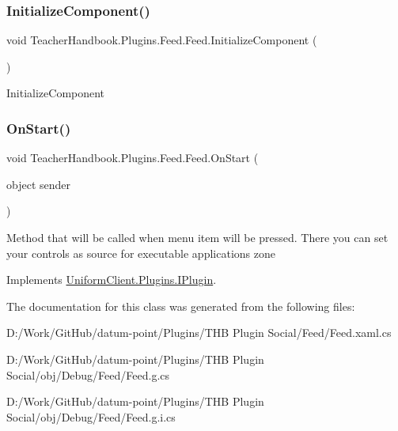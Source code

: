 \subsubsection{\texorpdfstring{Initialize\+Component()}{InitializeComponent()}\hspace{0.1cm}{\footnotesize\ttfamily [7/7]}}
{\footnotesize\ttfamily void Teacher\+Handbook.\+Plugins.\+Feed.\+Feed.\+Initialize\+Component (\begin{DoxyParamCaption}{ }\end{DoxyParamCaption})}



Initialize\+Component 

\mbox{\label{class_teacher_handbook_1_1_plugins_1_1_feed_1_1_feed_a70afd18136a6dc16b5edec667a02e6c6}} 
\subsubsection{\texorpdfstring{On\+Start()}{OnStart()}}
{\footnotesize\ttfamily void Teacher\+Handbook.\+Plugins.\+Feed.\+Feed.\+On\+Start (\begin{DoxyParamCaption}\item[{object}]{sender }\end{DoxyParamCaption})}



Method that will be called when menu item will be pressed. There you can set your controls as source for executable application\textquotesingle{}s zone 



Implements \mbox{\hyperlink{interface_uniform_client_1_1_plugins_1_1_i_plugin_a1ca2220c7ce4a23f8f41af10efccf328}{Uniform\+Client.\+Plugins.\+I\+Plugin}}.



The documentation for this class was generated from the following files\+:\begin{DoxyCompactItemize}
\item 
D\+:/\+Work/\+Git\+Hub/datum-\/point/\+Plugins/\+T\+H\+B Plugin Social/\+Feed/Feed.\+xaml.\+cs\item 
D\+:/\+Work/\+Git\+Hub/datum-\/point/\+Plugins/\+T\+H\+B Plugin Social/obj/\+Debug/\+Feed/Feed.\+g.\+cs\item 
D\+:/\+Work/\+Git\+Hub/datum-\/point/\+Plugins/\+T\+H\+B Plugin Social/obj/\+Debug/\+Feed/Feed.\+g.\+i.\+cs\end{DoxyCompactItemize}
